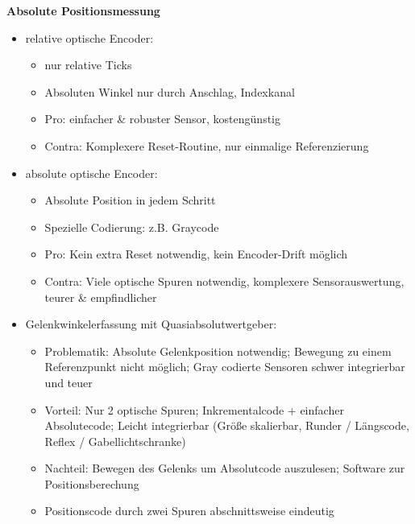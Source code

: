 \textbf{Absolute Positionsmessung}
\begin{itemize}
\setlength\itemsep{0em}
\item relative optische Encoder:
\begin{itemize}
\setlength\itemsep{0em}
\item nur relative Ticks
\item Absoluten Winkel nur durch Anschlag, Indexkanal
\item Pro: einfacher \& robuster Sensor, kostengünstig
\item Contra: Komplexere Reset-Routine, nur einmalige Referenzierung
\end{itemize}
\item absolute optische Encoder: 
\begin{itemize}
\setlength\itemsep{0em}
\item Absolute Position in jedem Schritt
\item Spezielle Codierung: z.B. Graycode
\item Pro: Kein extra Reset notwendig, kein Encoder-Drift möglich
\item Contra: Viele optische Spuren notwendig, komplexere Sensorauswertung, teurer \& empfindlicher
\end{itemize}
\item Gelenkwinkelerfassung mit Quasiabsolutwertgeber:
\begin{itemize}
\setlength\itemsep{0em}
\item Problematik: Absolute Gelenkposition notwendig; Bewegung zu einem Referenzpunkt nicht möglich; Gray codierte Sensoren schwer integrierbar und teuer
\item Vorteil: Nur 2 optische Spuren; Inkrementalcode + einfacher Absolutecode; Leicht integrierbar (Größe skalierbar, Runder / Längscode, Reflex / Gabellichtschranke)
\item Nachteil: Bewegen des Gelenks um Absolutcode auszulesen; Software zur Positionsberechung
\item Positionscode durch zwei Spuren abschnittsweise eindeutig
\end{itemize}
\end{itemize}
